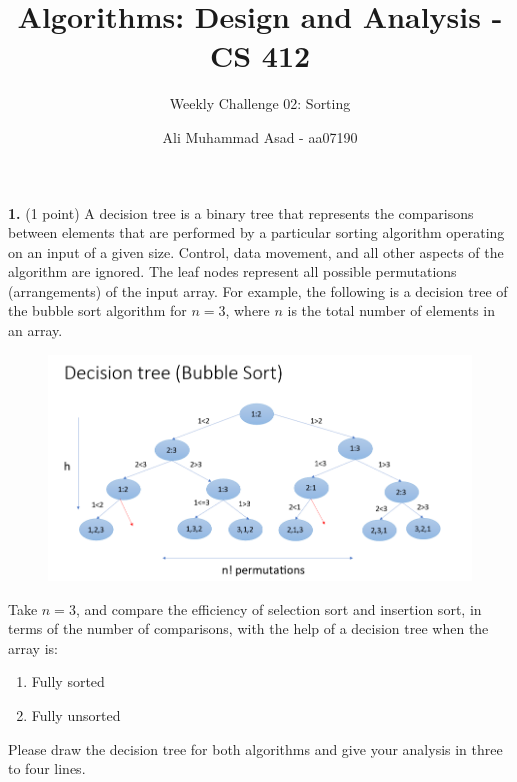 \documentclass[addpoints]{exam}
\title{Algorithms: Design and Analysis - CS 412 \vspace*{-4mm}}
\author{Weekly Challenge 02: Sorting}
\date{\vspace*{-4mm} Ali Muhammad Asad - aa07190}
\begin{document}
\maketitle


\begin{questions}
  \question[1]
  \textbf{1.}\; (1 point) A decision tree is a binary tree that represents the comparisons between elements that are performed by a particular sorting algorithm operating on an input of a given size. Control, data movement, and all other aspects of the algorithm are ignored. The leaf nodes represent all possible permutations (arrangements) of the input array. For example, the following is a decision tree of the bubble sort algorithm for $n = 3$, where $n$ is the total number of elements in an array.
  \begin{figure}[htbp]
    \centering
    \includegraphics[width=\textwidth]{dtree.png}
  \end{figure}

  Take $n = 3$,  and compare the efficiency of selection sort and insertion sort, in terms of the number of comparisons, with the help of a decision tree when the array is: \begin{enumerate}
    \item Fully sorted
    \item Fully unsorted
  \end{enumerate}

  Please draw the decision tree for both algorithms and give your analysis in three to four lines.


\end{questions}
\end{document}

